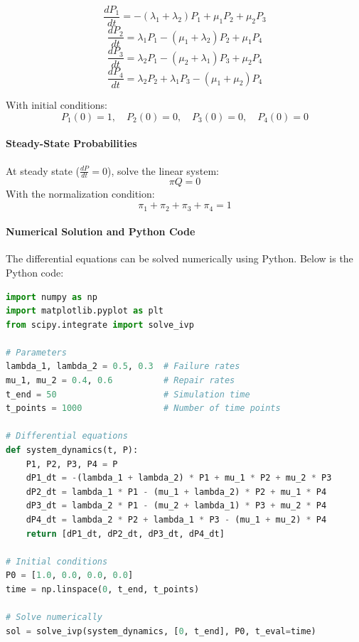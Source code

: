 \documentclass[a4paper,12pt]{article}
\begin{document}
	
	\begin{answerbox}
		\[
		\frac{dP_1}{dt} = -(\lambda_1 + \lambda_2)P_1 + \mu_1 P_2 + \mu_2 P_3
		\]
		\[
		\frac{dP_2}{dt} = \lambda_1 P_1 - (\mu_1 + \lambda_2)P_2 + \mu_1 P_4
		\]
		\[
		\frac{dP_3}{dt} = \lambda_2 P_1 - (\mu_2 + \lambda_1)P_3 + \mu_2 P_4
		\]
		\[
		\frac{dP_4}{dt} = \lambda_2 P_2 + \lambda_1 P_3 - (\mu_1 + \mu_2)P_4
		\]
		
		With initial conditions:
		\[
		P_1(0) = 1, \quad P_2(0) = 0, \quad P_3(0) = 0, \quad P_4(0) = 0
		\]
		
		\paragraph{Steady-State Probabilities}
		At steady state (\( \frac{dP}{dt} = 0 \)), solve the linear system:
		\[
		\pi Q = 0
		\]
		With the normalization condition:
		\[
		\pi_1 + \pi_2 + \pi_3 + \pi_4 = 1
		\]
		
		\paragraph{Numerical Solution and Python Code}
		The differential equations can be solved numerically using Python. Below is the Python code:
		
		
\begin{lstlisting}[language=Python]
import numpy as np
import matplotlib.pyplot as plt
from scipy.integrate import solve_ivp

# Parameters
lambda_1, lambda_2 = 0.5, 0.3  # Failure rates
mu_1, mu_2 = 0.4, 0.6          # Repair rates
t_end = 50                     # Simulation time
t_points = 1000                # Number of time points

# Differential equations
def system_dynamics(t, P):
	P1, P2, P3, P4 = P
	dP1_dt = -(lambda_1 + lambda_2) * P1 + mu_1 * P2 + mu_2 * P3
	dP2_dt = lambda_1 * P1 - (mu_1 + lambda_2) * P2 + mu_1 * P4
	dP3_dt = lambda_2 * P1 - (mu_2 + lambda_1) * P3 + mu_2 * P4
	dP4_dt = lambda_2 * P2 + lambda_1 * P3 - (mu_1 + mu_2) * P4
	return [dP1_dt, dP2_dt, dP3_dt, dP4_dt]

# Initial conditions
P0 = [1.0, 0.0, 0.0, 0.0]
time = np.linspace(0, t_end, t_points)

# Solve numerically
sol = solve_ivp(system_dynamics, [0, t_end], P0, t_eval=time)
\end{lstlisting}
\end{answerbox}
	
\end{document}

